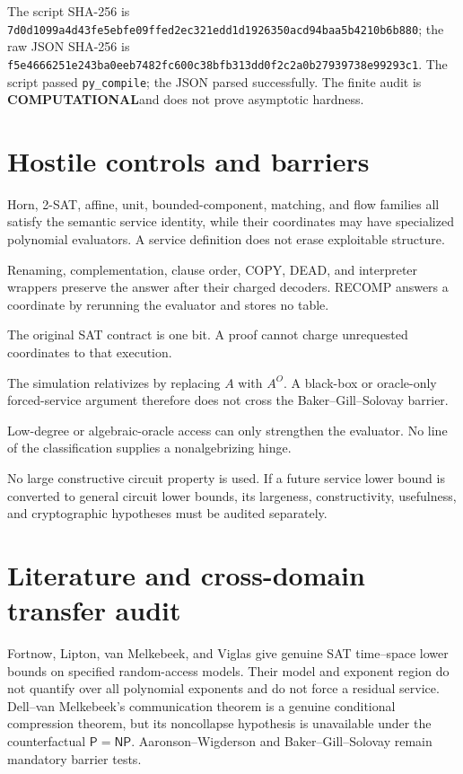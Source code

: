 \documentclass[11pt]{article}
\newcommand{\COMP}{\textbf{COMPUTATIONAL}}
\begin{document}
The script SHA-256 is
\texttt{7d0d1099a4d43fe5ebfe09ffed2ec321edd1d1926350acd94baa5b4210b6b880};
the raw JSON SHA-256 is
\texttt{f5e4666251e243ba0eeb7482fc600c38bfb313dd0f2c2a0b27939738e99293c1}.
The script passed \texttt{py\_compile}; the JSON parsed successfully.  The
finite audit is \COMP and does not prove asymptotic hardness.

\section{Hostile controls and barriers}

\begin{description}[leftmargin=3.1cm,style=nextline]
\item[Easy families.] Horn, 2-SAT, affine, unit, bounded-component, matching,
and flow families all satisfy the semantic service identity, while their
coordinates may have specialized polynomial evaluators.  A service definition
does not erase exploitable structure.
\item[Alternative encodings.] Renaming, complementation, clause order, COPY,
DEAD, and interpreter wrappers preserve the answer after their charged
decoders.  RECOMP answers a coordinate by rerunning the evaluator and stores
no table.
\item[One-bit output.] The original SAT contract is one bit.  A proof cannot
charge unrequested coordinates to that execution.
\item[Relativization.] The simulation relativizes by replacing $A$ with
$A^O$.  A black-box or oracle-only forced-service argument therefore does not
cross the Baker--Gill--Solovay barrier.
\item[Algebrization.] Low-degree or algebraic-oracle access can only strengthen
the evaluator.  No line of the classification supplies a nonalgebrizing hinge.
\item[Natural Proofs.] No large constructive circuit property is used.  If a
future service lower bound is converted to general circuit lower bounds, its
largeness, constructivity, usefulness, and cryptographic hypotheses must be
audited separately.
\end{description}

\section{Literature and cross-domain transfer audit}

Fortnow, Lipton, van Melkebeek, and Viglas give genuine SAT time--space lower
bounds on specified random-access models.  Their model and exponent region do
not quantify over all polynomial exponents and do not force a residual service.
Dell--van Melkebeek's communication theorem is a genuine conditional
compression theorem, but its noncollapse hypothesis is unavailable under the
counterfactual $\mathsf P=\mathsf{NP}$.  Aaronson--Wigderson and
Baker--Gill--Solovay remain mandatory barrier tests.
\end{document}
